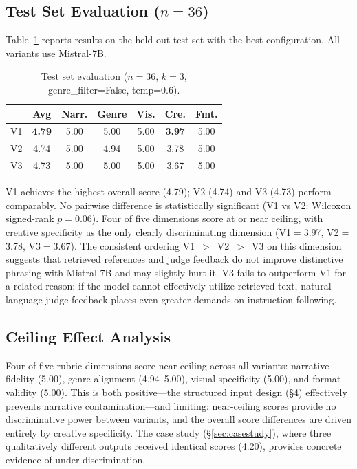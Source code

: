 \documentclass[10pt,twocolumn]{article}
\begin{document}
\subsection{Test Set Evaluation ($n{=}36$)}
\label{sec:test}
Table~\ref{tab:testset} reports results on the held-out test set with the best configuration. All variants use Mistral-7B.

\begin{table}[h]
\centering
\small
\caption{Test set evaluation ($n{=}36$, $k{=}3$, genre\_filter=False, temp=0.6).}
\label{tab:testset}
\begin{tabular}{lcccccc}
\toprule
 & \textbf{Avg} & \textbf{Narr.} & \textbf{Genre} & \textbf{Vis.} & \textbf{Cre.} & \textbf{Fmt.} \\
\midrule
V1 & \textbf{4.79} & 5.00 & 5.00 & 5.00 & \textbf{3.97} & 5.00 \\
V2 & 4.74 & 5.00 & 4.94 & 5.00 & 3.78 & 5.00 \\
V3 & 4.73 & 5.00 & 5.00 & 5.00 & 3.67 & 5.00 \\
\bottomrule
\end{tabular}
\end{table}

V1 achieves the highest overall score (4.79); V2 (4.74) and V3 (4.73) perform comparably. No pairwise difference is statistically significant (V1 vs V2: Wilcoxon signed-rank $p{=}0.06$). Four of five dimensions score at or near ceiling, with creative specificity as the only clearly discriminating dimension (V1$=$3.97, V2$=$3.78, V3$=$3.67). The consistent ordering V1~$>$~V2~$>$~V3 on this dimension suggests that retrieved references and judge feedback do not improve distinctive phrasing with Mistral-7B and may slightly hurt it. V3 fails to outperform V1 for a related reason: if the model cannot effectively utilize retrieved text, natural-language judge feedback places even greater demands on instruction-following.

\subsection{Ceiling Effect Analysis}
\label{sec:ceiling}
Four of five rubric dimensions score near ceiling across all variants: narrative fidelity (5.00), genre alignment (4.94--5.00), visual specificity (5.00), and format validity (5.00). This is both positive---the structured input design (\S4) effectively prevents narrative contamination---and limiting: near-ceiling scores provide no discriminative power between variants, and the overall score differences are driven entirely by creative specificity. The case study (\S\ref{sec:casestudy}), where three qualitatively different outputs received identical scores (4.20), provides concrete evidence of under-discrimination.
\end{document}
